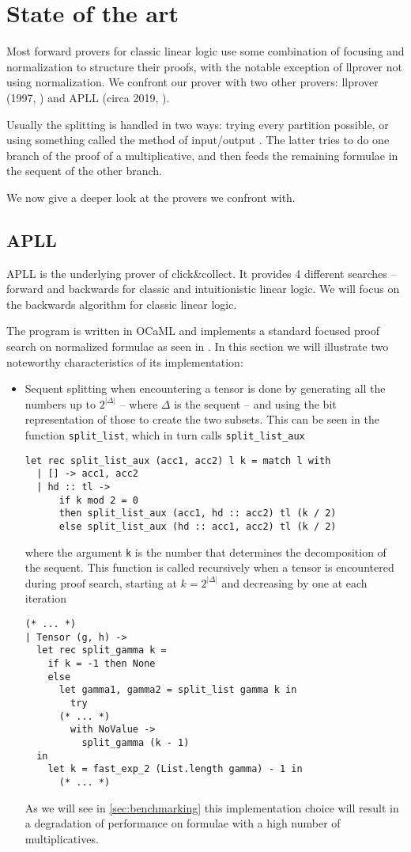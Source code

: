\chapter{State of the art}
Most forward provers for classic linear logic use some combination of focusing and normalization to structure their proofs, with the notable exception of llprover not using normalization.	%
We confront our prover with two other provers: llprover (1997, %
) and APLL (circa 2019, %
).

Usually the splitting is handled in two ways: trying every partition possible, or using something called the method of input/output %
. The latter tries to do one branch of the proof of a multiplicative, and then feeds the remaining formulae in the sequent of the other branch.

We now give a deeper look at the provers we confront with.

\section{APLL}\label{sec:apll}
APLL is the underlying prover of click\&collect. %
It provides 4 different searches -- forward and backwards for classic and intuitionistic linear logic. 
We will focus on the backwards algorithm for classic linear logic.


The program is written in OCaML and implements a standard focused proof search on normalized formulae as seen in \cite{LiangMiller}.
In this section we will illustrate two noteworthy characteristics of its implementation:
\begin{itemize}
	\item Sequent splitting when encountering a tensor is done by generating all the numbers up to $2^{|\Delta|}$ -- where $\Delta$ is the sequent -- and using the bit representation of those to create the two subsets.
		This can be seen in the function \texttt{split\_list}, which in turn calls \texttt{split\_list\_aux}
		\begin{verbatim}
let rec split_list_aux (acc1, acc2) l k = match l with
  | [] -> acc1, acc2
  | hd :: tl -> 
      if k mod 2 = 0 
      then split_list_aux (acc1, hd :: acc2) tl (k / 2)
      else split_list_aux (hd :: acc1, acc2) tl (k / 2)
		\end{verbatim}
		where the argument \texttt{k} is the number that determines the decomposition of the sequent.
		This function is called recursively when a tensor is encountered during proof search, starting at $ k = 2^{|\Delta|}$ and decreasing by one at each iteration
		\begin{verbatim}
(* ... *)
| Tensor (g, h) ->
  let rec split_gamma k = 
    if k = -1 then None
    else
      let gamma1, gamma2 = split_list gamma k in
        try
	  (* ... *)
        with NoValue ->
          split_gamma (k - 1) 
  in
    let k = fast_exp_2 (List.length gamma) - 1 in
      (* ... *)
		\end{verbatim}

		As we will see in \ref{sec:benchmarking} this implementation choice will result in a degradation of performance on formulae with a high number of multiplicatives.
\end{itemize}

